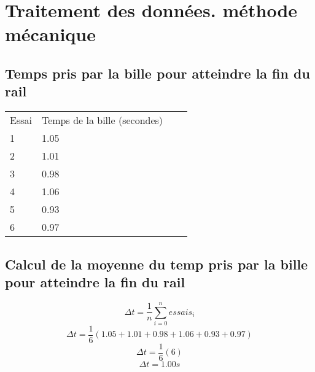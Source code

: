 \documentclass{article}
\begin{document}
        \vspace{20mm}

        \section{Traitement des données. méthode mécanique}
            \subsection{Temps pris par la bille pour atteindre la fin du rail}
                \begin{table}[H]\centering
                \begin{tabular}{llll}
                Essai & Temps de la bille (secondes) &  &  \\
                1     & 1.05                         &  &  \\
                2     & 1.01                         &  &  \\
                3     & 0.98                         &  &  \\
                4     & 1.06                         &  &  \\
                5     & 0.93                         &  &  \\
                6     & 0.97                         &  &
                \end{tabular}
                \end{table}
            \subsection{Calcul de la moyenne du temp pris par la bille pour atteindre la fin du rail}

                \vspace{5mm}
                \begin{equation}
                \Delta t = \frac{1}{n}  \sum_{i=0}^{n} essais_i
                \end{equation}
                \vspace{5mm}
                \begin{equation}
                \Delta t = \frac{1}{6} (1.05+1.01+0.98+1.06+0.93+0.97)
                \end{equation}
                \vspace{5mm}
                \begin{equation}
                    \Delta t = \frac{1}{6} (6)
                \end{equation}
                \vspace{5mm}
                \begin{equation}
                    \Delta t = 1.00 s
                \end{equation}
                \vspace{5mm}
\end{document}

